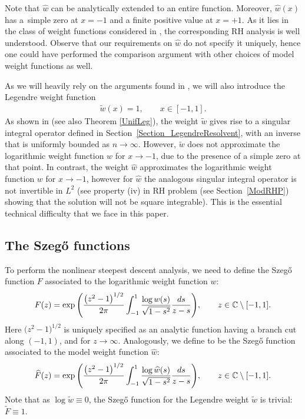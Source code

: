 \documentclass[11pt]{article}
\numberwithin{equation}{section}
\newcommand{\C}{\mathbb{C}}
\newcommand{\hw}{\widehat w}
\newcommand{\tw}{\widetilde w}
\newcommand{\hF}{\widehat F}
\numberwithin{equation}{section}
\begin{document}
Note that $\hw$ can be analytically extended to an entire function. Moreover, $\hw(x)$ has a~simple zero at $x = -1$ and a finite positive value at $x = +1$. As it lies in the class of weight functions considered in \cite{KMVV}, the corresponding RH analysis is well understood. Observe that our requirements on $\hw$ do not specify it uniquely, hence one could have performed the comparison argument with other choices of model weight functions as well.

As we will heavily rely on the arguments found in \cite{CD}, we will also introduce the Legendre weight function
\begin{align*}
 \tw(x) = 1, \qquad x \in [-1,1].
\end{align*}
As shown in \cite[Theorem 4.7]{CD} (see also Theorem \ref{UnifLeg}), the weight $\tw$ gives rise to a singular integral operator defined in Section~\ref{Section_LegendreResolvent}, with an inverse that is uniformly bounded as $n \to \infty$. However, $\tw$ does not approximate the logarithmic weight function $w$ for $x\to -1$, due to the presence of a simple zero at that point. In contrast, the weight $\hw$ approximates the logarithmic weight function $w$ for $x \to -1$, however for $\hw$ the analogous singular integral operator is not invertible in $L^2$ (see property (iv) in RH problem (see Section~\ref{ModRHP}) showing that the solution will not be square integrable). This is the essential technical difficulty that we face in this paper.

\subsection[The Szego functions]{The Szeg\H{o} functions}
To perform the nonlinear steepest descent analysis, we need to define the Szeg\H{o} function $F$ associated to the logarithmic weight function $w$:
\begin{align}\label{SzegoF}
 F(z) = \exp \Bigg( \dfrac{\big(z^2-1\big)^{1/2}}{2 \pi}\int_{-1}^1 \dfrac{\log w(s)}{\sqrt{1-s^2}} \dfrac{{\rm d}s}{z-s} \Bigg), \qquad z \in \C \setminus [-1,1].
\end{align}
Here $\big(z^2-1\big)^{1/2}$ is uniquely specified as an analytic function having a branch cut along $(-1,1)$, and  for $z\to \infty$. Analogously, we define \smash{$\hF$} to be the Szeg\H{o} function associated to the model weight function $\hw$:
\begin{align*}
 \hF(z) = \exp \Bigg( \dfrac{\big(z^2-1\big)^{1/2}}{2 \pi}\int_{-1}^1 \dfrac{\log \hw(s)}{\sqrt{1-s^2}} \dfrac{{\rm d}s}{z-s} \Bigg), \qquad z \in \C \setminus [-1,1].
\end{align*}
Note that as $\log \tw \equiv 0$, the Szeg\H{o} function for the Legendre weight $\tw$ is trivial: $\widetilde F \equiv 1$.
\end{document}

